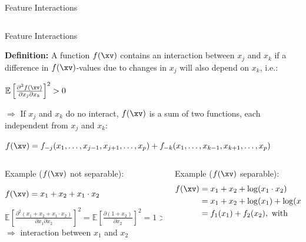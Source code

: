 \documentclass[11pt,compress,t,notes=noshow, aspectratio=169, xcolor=table]{beamer}
\begin{document}
\begin{frame}{Feature Interactions}
\begin{itemize}
\begin{columns}[T, totalwidth=\textwidth]
\begin{column}{0.5\textwidth}
\end{column}
\end{columns}
\end{itemize}
\end{frame}

\begin{frame}{Feature Interactions }

\textbf{Definition:} A function $f(\xv)$ contains an interaction between $x_j$ and $x_k$ if a difference in $f(\xv)$-values due to changes in $x_j$ will also depend on $x_k$, i.e.: %
\medskip
\centerline{$\mathbb{E} \left[ \frac{\partial^2 f(\xv)}{\partial x_j \partial x_k} \right]^2 > 0$}
\medskip
$\Rightarrow$ If $x_j$ and $x_k$ do no interact, $f(\xv)$ is a sum of two functions, each independent from $x_j$ and $x_k$:

\medskip

\centerline{$f(\xv) = f_{-j}(x_1, \ldots, x_{j-1}, x_{j+1}, \ldots, x_p) + f_{-k}(x_1, \ldots, x_{k-1}, x_{k+1}, \ldots, x_p)$}

\medskip\pause

\begin{columns}[T, totalwidth=\textwidth]
\begin{column}{0.5\textwidth}
Example ($f(\xv)$ not separable):
\medskip

\centerline{$f(\xv) = x_1 + x_2 + x_1 \cdot x_2$}
\medskip
$\mathbb{E} \left[ \tfrac{\partial^2 (x_1 + x_2 + x_1 \cdot x_2)}{\partial x_1 \partial x_2} \right]^2 = \mathbb{E} \left[ \tfrac{\partial (1 + x_2)}{\partial x_2} \right]^2 = 1 > 0$\\
\medskip
$\Rightarrow$ interaction between $x_1$ and $x_2$ 
\end{column}
\pause
\begin{column}{0.5\textwidth}
Example ($f(\xv)$ separable):
\setlength{\abovedisplayskip}{0pt}
\setlength{\belowdisplayskip}{0pt}
\setlength{\abovedisplayshortskip}{0pt}
\setlength{\belowdisplayshortskip}{0pt}
\medskip
\begin{align*}
	f(\xv) &= x_1 + x_2 + \log(x_1 \cdot x_2)\\
	       &= x_1 + x_2 + \log(x_1) + \log(x_2)\\
	       &= f_1(x_1) + f_2(x_2), \text{ with }
\end{align*}


\end{column}
\end{columns}
\end{frame}
\end{document}
